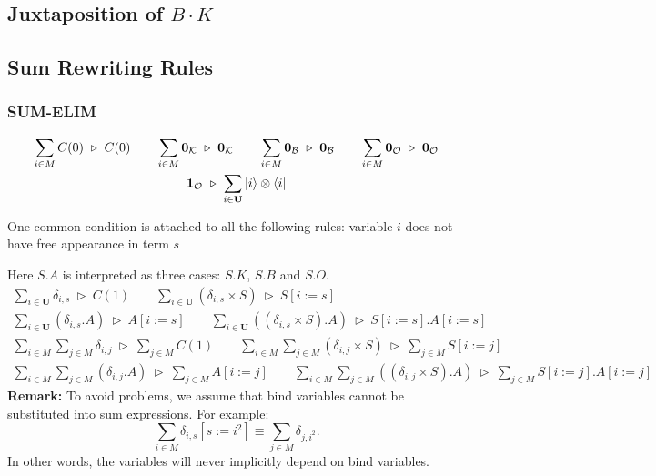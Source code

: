 \documentclass[manuscript, review, timestamp]{acmart}
\newcommand*{\reduce}{\ \triangleright\ }
\begin{document}
\subsection{Juxtaposition of $B\cdot K$}


\subsection{Sum Rewriting Rules}
\subsubsection*{\textsf{SUM-ELIM}}

\begin{gather*}
  \sum_{i \in M} C(0) \reduce C(0)
  \qquad
  \sum_{i \in M} \mathbf{0}_\mathcal{K} \reduce \mathbf{0}_\mathcal{K}
  \qquad
  \sum_{i \in M} \mathbf{0}_\mathcal{B} \reduce \mathbf{0}_\mathcal{B}
  \qquad
  \sum_{i \in M} \mathbf{0}_\mathcal{O} \reduce \mathbf{0}_\mathcal{O}\\
  \mathbf{1}_\mathcal{O} \reduce \sum_{i \in \mathbf{U}} \ket{i}\otimes\bra{i}
\end{gather*}

One common condition is attached to all the following rules: variable $i$ does not have free appearance in term $s$

Here $S.A$ is interpreted as three cases: $S.K$, $S.B$ and $S.O$.
\begin{gather*}
  \sum_{i \in \mathbf{U}} \delta_{i, s} \reduce C(1)
  \qquad
  \sum_{i \in \mathbf{U}} (\delta_{i, s} \times S) \reduce S[i:=s] \\
  \sum_{i \in \mathbf{U}} (\delta_{i, s}.A) \reduce A[i:=s]
  \qquad
  \sum_{i \in \mathbf{U}} ((\delta_{i, s} \times S).A) \reduce S[i:=s].A[i:=s]
\end{gather*}
\begin{gather*}
  \sum_{i \in M} \sum_{j \in M} \delta_{i, j} \reduce \sum_{j \in M} C(1)
  \qquad
  \sum_{i \in M} \sum_{j \in M} (\delta_{i, j} \times S) \reduce \sum_{j \in M} S[i:=j] \\
  \sum_{i \in M} \sum_{j \in M} (\delta_{i, j}.A) \reduce \sum_{j \in M} A[i:=j]
  \qquad
  \sum_{i \in M} \sum_{j \in M} ((\delta_{i, j} \times S).A) \reduce \sum_{j \in M} S[i:=j].A[i:=j]
\end{gather*}
\textbf{Remark:} To avoid problems, we assume that bind variables cannot be substituted into sum expressions. For example:
$$
\sum_{i \in M} \delta_{i, s}[s:=i^2] \equiv \sum_{j \in M} \delta_{j, i^2}.
$$
In other words, the variables will never implicitly depend on bind variables.
\end{document}
